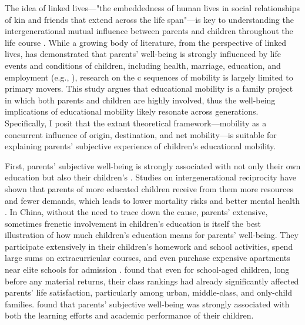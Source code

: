 The idea of linked lives—"the embeddedness of human lives in social relationships of kin and friends that extend across the life span"—is key to understanding the intergenerational mutual influence between parents and children throughout the life course \parencite{elderFamiliesLivesDevelopments1987,macmillanFamiliesLifeCourse2005}. While a growing body of literature, from the perspective of linked lives, has demonstrated that parents' well-being is strongly influenced by life events and conditions of children, including health, marriage, education, and employment (e.g., \cite{friedmanSchoolingOffspringSurvival2014,maDoesAdultChildrens2022,zhangChildrensTransitionsAdulthood2023}), research on the c sequences of mobility is largely limited to primary movers. This study argues that educational mobility is a family project in which both parents and children are highly involved, thus the well-being implications of educational mobility likely resonate across generations. Specifically, I posit that the extant theoretical framework—mobility as a concurrent influence of origin, destination, and net mobility—is suitable for explaining parents' subjective experience of children's educational mobility.

First, parents' subjective well-being is strongly associated with not only their own education but also their children's \parencite{chenEducationFeverChina2021,maDoesAdultChildrens2022}. Studies on intergenerational reciprocity have shown that parents of more educated children receive from them more resources and fewer demands, which leads to lower mortality risks and better mental health \parencite{friedmanSchoolingOffspringSurvival2014,maDoesAdultChildrens2022}. In China, without the need to trace down the cause, parents' extensive, sometimes frenetic involvement in children's education is itself the best illustration of how much children's education means for parents' well-being. They participate extensively in their children's homework and school activities, spend large sums on extracurricular courses, and even purchase expensive apartments near elite schools for admission \parencite{fengSchoolQualityHousing2013,zhouFamilySocioeconomicEffect2015}. \textcite{chenEducationFeverChina2021} found that even for school-aged children, long before any material returns, their class rankings had already significantly affected parents' life satisfaction, particularly among urban, middle-class, and only-child families. \textcite{tongChildrensAcademicPerformance2021} found that parents' subjective well-being was strongly associated with both the learning efforts and academic performance of their children.

